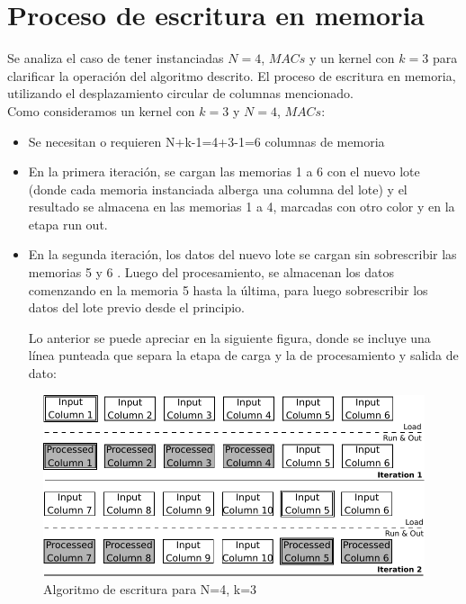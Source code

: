 \section{Proceso de escritura en memoria}  \label{writing_subsecc}
\smallskip
Se analiza el caso de tener instanciadas $N=4$, $MACs$ y un kernel con $k=3$ para clarificar la operación del algoritmo descrito.
El proceso de escritura en memoria, utilizando el desplazamiento circular de columnas mencionado.\\

Como consideramos un kernel con $k=3$ y $N=4$, $MACs$:
\begin{frame}{}
	    
      \begin{itemize}
        \item Se necesitan o requieren N+k-1=4+3-1=6 columnas de memoria
	\item En la primera iteración, se cargan las memorias 1 a 6 con el nuevo lote (donde cada memoria instanciada alberga una columna del lote) y el resultado se almacena en las memorias 1 a 4, marcadas con otro color y en la etapa run  out.
	\item En la segunda iteración, los datos del nuevo lote se cargan sin sobrescribir las memorias 5 y 6 . Luego del procesamiento, se almacenan los datos comenzando en la memoria  5 hasta la última, para luego sobrescribir los datos del lote previo desde el principio.

\bigskip
\bigskip
Lo anterior se puede apreciar en la siguiente figura, donde se incluye una línea punteada que separa la etapa de carga y la de procesamiento y salida de dato:

\end{itemize}
\end{frame}

\begin{figure}
\centering
\includegraphics[scale=0.8]{algorithm}
\caption{Algoritmo de escritura para N=4, k=3 }
\label{writingprocess1}
\end{figure}

